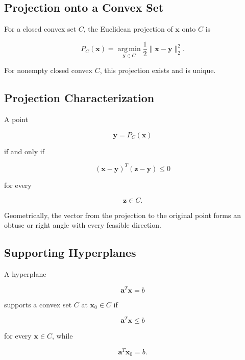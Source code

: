 \subsection{Projection onto a Convex Set}
\label{subsec:projection-convex-set}

For a closed convex set \(C\), the Euclidean projection of
\(\mathbf{x}\) onto \(C\) is

\[
\boxed{
P_C(\mathbf{x})
=
\operatorname*{arg\,min}_{\mathbf{y}\in C}
\frac12
\|
\mathbf{x}-\mathbf{y}
\|_2^2.
}
\]

For nonempty closed convex \(C\), this projection exists and is unique.

\subsection{Projection Characterization}
\label{subsec:projection-characterization}

A point

\[
\mathbf{y}=P_C(\mathbf{x})
\]

if and only if

\[
\boxed{
(\mathbf{x}-\mathbf{y})^T
(\mathbf{z}-\mathbf{y})
\leq0
}
\]

for every

\[
\mathbf{z}\in C.
\]

Geometrically, the vector from the projection to the original point forms
an obtuse or right angle with every feasible direction.

\subsection{Supporting Hyperplanes}
\label{subsec:supporting-hyperplanes}

A hyperplane

\[
\boxed{
\mathbf{a}^T\mathbf{x}=b
}
\]

supports a convex set \(C\) at \(\mathbf{x}_0\in C\) if

\[
\boxed{
\mathbf{a}^T\mathbf{x}
\leq b
}
\]

for every \(\mathbf{x}\in C\), while

\[
\boxed{
\mathbf{a}^T\mathbf{x}_0=b.
}
\]

